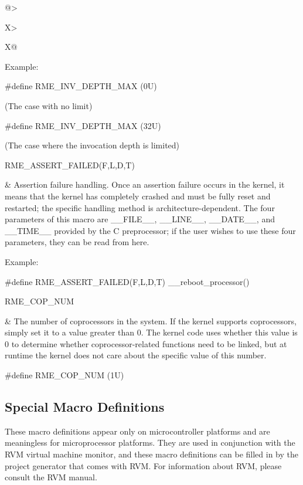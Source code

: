 \begin{xltabular}{\textwidth}{@{}>{\hsize\raggedright\arraybackslash}X>{\hsize\raggedright\arraybackslash}X@{}}
Example:

\#define RME\_INV\_DEPTH\_MAX (0U)

(The case with no limit)

\#define RME\_INV\_DEPTH\_MAX (32U)

(The case where the invocation depth is limited)\strut
\tabularnewline
RME\_ASSERT\_FAILED(F,L,D,T)\strut
 & Assertion failure handling. Once an assertion failure occurs in the kernel, it means that the kernel has completely crashed and must be fully reset and restarted; the specific handling method is architecture-dependent. The four parameters of this macro are \_\_FILE\_\_, \_\_LINE\_\_, \_\_DATE\_\_, and \_\_TIME\_\_ provided by the C preprocessor; if the user wishes to use these four parameters, they can be read from here.

Example:

\#define RME\_ASSERT\_FAILED(F,L,D,T) \_\_reboot\_processor()\strut
\tabularnewline
RME\_COP\_NUM\strut
 & The number of coprocessors in the system. If the kernel supports coprocessors, simply set it to a value greater than 0. The kernel code uses whether this value is 0 to determine whether coprocessor-related functions need to be linked, but at runtime the kernel does not care about the specific value of this number.

\#define RME\_COP\_NUM (1U)\strut
\tabularnewline
\end{xltabular}
\nopagebreak[4]

\subsection{Special Macro Definitions}\label{subsec:7-special-macro-definitions}

These macro definitions appear only on microcontroller platforms and are meaningless for microprocessor platforms. They are used in conjunction with the RVM virtual machine monitor, and these macro definitions can be filled in by the project generator that comes with RVM. For information about RVM, please consult the RVM manual.

